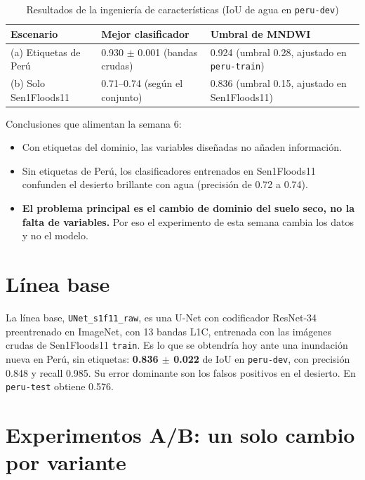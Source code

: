 \begin{table}[H]
    \centering
    \small
    \caption{Resultados de la ingeniería de características (IoU de agua en \texttt{peru-\allowbreak{}dev})}
    \label{tab:sprint_fe}
    \begin{tabular}{|p{3.6cm}|p{4.8cm}|p{5.8cm}|}
        \hline
        \textbf{Escenario} & \textbf{Mejor clasificador} & \textbf{Umbral de MNDWI} \\
        \hline
        (a) Etiquetas de Perú & 0.930 $\pm$ 0.001 (bandas crudas) & 0.924 (umbral 0.28, ajustado en \texttt{peru-\allowbreak{}train}) \\
        \hline
        (b) Solo Sen1Floods11 & 0.71--0.74 (según el conjunto) & 0.836 (umbral 0.15, ajustado en Sen1Floods11) \\
        \hline
    \end{tabular}
\end{table}

Conclusiones que alimentan la semana 6:
\begin{itemize}
    \item Con etiquetas del dominio, las variables diseñadas no añaden información.
    \item Sin etiquetas de Perú, los clasificadores entrenados en Sen1Floods11 confunden el desierto
    brillante con agua (precisión de 0.72 a 0.74).
    \item \textbf{El problema principal es el cambio de dominio del suelo seco, no la falta de
    variables.} Por eso el experimento de esta semana cambia los datos y no el modelo.
\end{itemize}

\section{Línea base}

La línea base, \texttt{UNet\_\allowbreak{}s1f11\_\allowbreak{}raw}, es una U-Net \cite{ronneberger_unet_2015} con codificador
ResNet-34 \cite{he_deep_2016} preentrenado en ImageNet, con 13 bandas L1C, entrenada con las
imágenes crudas de Sen1Floods11 \texttt{train}. Es lo que se obtendría hoy ante una inundación nueva
en Perú, sin etiquetas: \textbf{0.836 $\pm$ 0.022} de IoU en \texttt{peru-\allowbreak{}dev}, con precisión 0.848
y recall 0.985. Su error dominante son los falsos positivos en el desierto. En \texttt{peru-\allowbreak{}test}
obtiene 0.576.

\section{Experimentos A/B: un solo cambio por variante}

